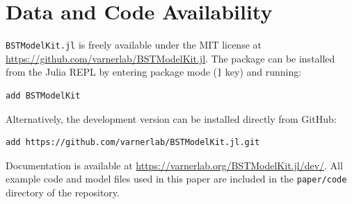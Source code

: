 \documentclass[11pt]{article}
\begin{document}
\section*{Data and Code Availability}
\texttt{BSTModelKit.jl} is freely available under the MIT license at \url{https://github.com/varnerlab/BSTModelKit.jl}. The package can be installed from the Julia REPL by entering package mode (\texttt{]} key) and running:
\begin{lstlisting}[language={},numbers=none,backgroundcolor=\color{codebg}]
add BSTModelKit
\end{lstlisting}
\noindent Alternatively, the development version can be installed directly from GitHub:
\begin{lstlisting}[language={},numbers=none,backgroundcolor=\color{codebg}]
add https://github.com/varnerlab/BSTModelKit.jl.git
\end{lstlisting}
\noindent Documentation is available at \url{https://varnerlab.org/BSTModelKit.jl/dev/}. All example code and model files used in this paper are included in the \texttt{paper/code} directory of the repository.



\end{document}
